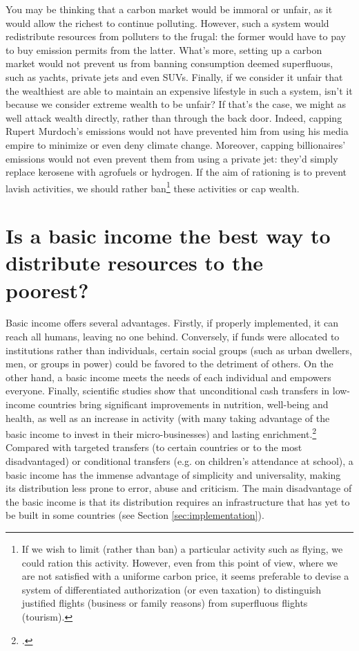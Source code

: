 \documentclass[a5paper,english,openany]{memoir}
\begin{document}
You may be thinking that a carbon market would be immoral or unfair, as it would allow the richest to continue polluting. However, such a system would redistribute resources from polluters to the frugal: the former would have to pay to buy emission permits from the latter. What's more, setting up a carbon market would not prevent us from banning consumption deemed superfluous, such as yachts, private jets and even SUVs. Finally, if we consider it unfair that the wealthiest are able to maintain an expensive lifestyle in such a system, isn't it because we consider extreme wealth to be unfair? If that's the case, we might as well attack wealth directly, rather than through the back door. Indeed, capping Rupert Murdoch's emissions would not have prevented him from using his media empire to minimize or even deny climate change. Moreover, capping billionaires' emissions would not even prevent them from using a private jet: they'd simply replace kerosene with agrofuels or hydrogen. If the aim of rationing is to prevent lavish activities, we should rather ban\footnote{If we wish to limit (rather than ban) a particular activity such as flying, we could ration this activity. However, even from this point of view, where we are not satisfied with a uniforme carbon price, it seems preferable to devise a system of differentiated authorization (or even taxation) to distinguish justified flights (business or family reasons) from superfluous flights (tourism). 
} these activities or cap wealth.  %

\section*{\normalsize Is a basic income the best way to distribute resources to the poorest?}\label{q:rdb}

Basic income offers several advantages. Firstly, if properly implemented, it can reach all humans, leaving no one behind. Conversely, if funds were allocated to institutions rather than individuals, certain social groups (such as urban dwellers, men, or groups in power) could be favored to the detriment of others. On the other hand, a basic income meets the needs of each individual and empowers everyone. Finally, scientific studies show that unconditional cash transfers in low-income countries bring significant improvements in nutrition, well-being and health, as well as an increase in activity (with many taking advantage of the basic income to invest in their micro-businesses) and lasting enrichment.\footnote{\citet{egger_general_2022,haushofer_short-term_2016,standing_little_2014}.} Compared with targeted transfers (to certain countries or to the most disadvantaged) or conditional transfers (e.g. on children's attendance at school), a basic income has the immense advantage of simplicity and universality, making its distribution less prone to error, abuse and criticism. The main disadvantage of the basic income is that its distribution requires an infrastructure that has yet to be built in some countries (see Section \ref{sec:implementation}).  %
\end{document}
